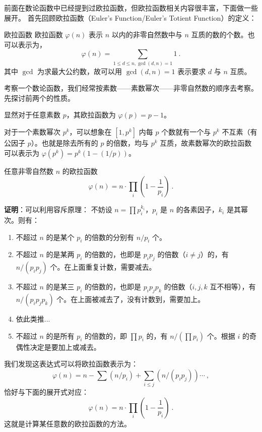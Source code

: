 

前面在数论函数中已经提到过欧拉函数，但欧拉函数相关内容很丰富，下面做一些展开。
首先回顾欧拉函数（Euler's Function/Euler's Totient Function）的定义：
\begin{definition}{欧拉函数}
欧拉函数 $\varphi(n)$ 表示 $n$ 以内的非零自然数中与 $n$ 互质的数的个数。也可以表示为，
$$\varphi(n) = \sum_{1 \le d \le n, \gcd(d, n) = 1} 1  ~.$$
其中 $\gcd$ 为求最大公约数，故可以用 $\gcd(d, n)=1$ 表示要求 $d$ 与 $n$ 互质。
\end{definition}

考察一个数论函数，我们经常按素数——素数幂次——非零自然数的顺序去考察。先探讨前两个的性质。

显然对于任意素数 $p$，其欧拉函数为 $\varphi(p) = p-1$。

对于一个素数幂次 $p^k$，可以想象在 $[1, p^k]$ 内每 $p$ 个数就有一个与 $p^k$ 不互素（有公因子 $p$）。也就是除去所有的 $p$ 的倍数，均与 $p^k$ 互质，故素数幂次的欧拉函数可以表示为 $\varphi(p^k) = p^k \left(1 - (1/p)\right)$。

\begin{corollary}{任意非零自然数 $n$ 的欧拉函数}\label{cor_EulFun_1}
\begin{equation}
\varphi(n) = n \cdot \prod_i \left( 1 - \frac1{p_i}\right)~.
\end{equation}
\end{corollary}
\textbf{证明}：可以利用容斥原理：
不妨设 $n = \prod {p_i^{k_i}}$，$p_i$ 是 $n$ 的各素因子，$k_i$ 是其幂次。则有：
\begin{enumerate}
\item 不超过 $n$ 的是某个 $p_i$ 的倍数的分别有 $n/p_i$ 个。
\item 不超过 $n$ 的是某两 $p_i$ 的倍数的，也即是 $p_i p_j$ 的倍数（$i \neq j$）的，有 $n/(p_i p_j)$ 个。在上面重复计数，需要减去。
\item 不超过 $n$ 的是某三 $p_i$ 的倍数的，也即是 $p_i p_j p_k$ 的倍数（$i, j, k$ 互不相等），有 $n/(p_i p_j p_k)$ 个。在上面被减去了，没有计数到，需要加上。
\item 依此类推...
\item 不超过 $n$ 的是所有 $p_i$ 的倍数的，即 $\prod p_i$ 的，有 $n/(\prod p_i)$ 个。根据 $i$ 的奇偶性决定是要加上或减去。
\end{enumerate}
我们发现这表达式可以将欧拉函数表示为：
$$\varphi(n) = n - \sum(n/p_i) + \sum_{i\le j} (n/(p_i p_j)) \cdots  ~, $$
恰好与下面的展开式对应：
$$\varphi(n) = n \cdot \prod_i \left( 1 - \frac1{p_i}\right)~.$$
这就是计算某任意数的欧拉函数的方法。

